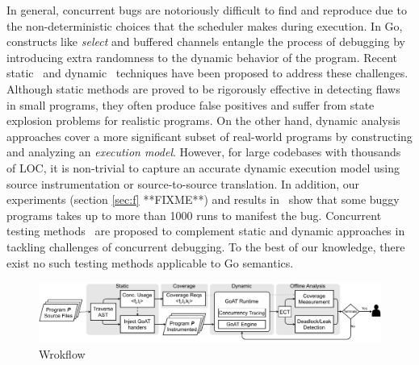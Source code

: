 In general, concurrent bugs are notoriously difficult to find and reproduce due to the non-deterministic choices that the scheduler makes during execution.
%
In Go, constructs like \textit{select} and buffered channels entangle the process of debugging by introducing extra randomness to the dynamic behavior of the program.
%
Recent static~\cite{ng-dl-cc16,stadtmuller-minigo-aplas16,lange-fence-popl17,lange-staticType-icse18} and dynamic~\cite{go-race-blog,zhao-occam97,sulzmann-corr17,sulzmann-twophase-2018,dilley-gomela-corr2020} techniques have been proposed to address these challenges.
%
Although static methods are proved to be rigorously effective in detecting flaws in small programs, they often produce false positives and suffer from state explosion problems for realistic programs.
%
On the other hand, dynamic analysis approaches cover a more significant subset of real-world programs by constructing and analyzing an \textit{execution model}.
%
However, for large codebases with thousands of LOC, it is non-trivial to capture an accurate dynamic execution model using source instrumentation or source-to-source translation.
%
In addition, our experiments (section \ref{sec:f} **FIXME**) and results in~\cite{yuan-gobench-cgo21} show that some buggy programs takes up to more than 1000 runs to manifest the bug.
%
Concurrent testing methods~\cite{arora-concrrentTesting-16} are proposed to complement static and dynamic approaches in tackling challenges of concurrent debugging.
%
To the best of our knowledge, there exist no such testing methods applicable to Go semantics.
%

\begin{figure}[]
\centering
\includegraphics[width=0.99\linewidth]{figs/GOAT_overview.pdf}
\caption{\goat Wrokflow}
\label{fig:goat_workflow}
\end{figure}



